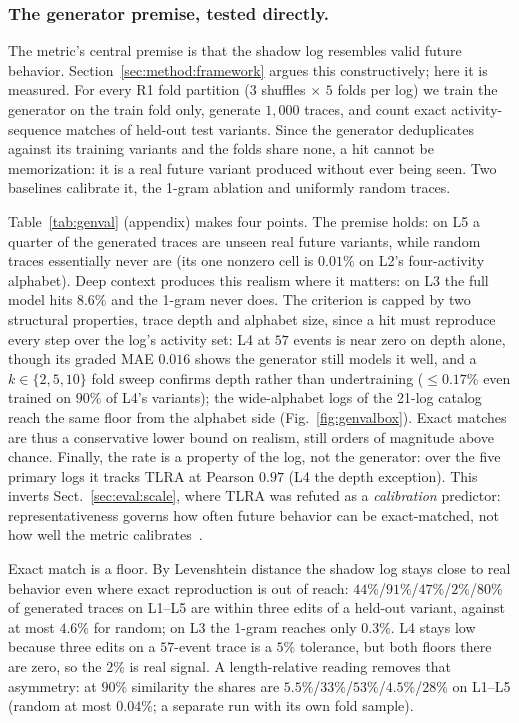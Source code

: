\documentclass[runningheads]{llncs}
\begin{document}
\subsubsection{The generator premise, tested directly.}
\label{sec:eval:genval}
The metric's central premise is that the shadow log resembles valid future behavior. Section~\ref{sec:method:framework} argues this constructively; here it is measured. For every R1 fold partition ($3$ shuffles $\times$ $5$ folds per log) we train the generator on the train fold only, generate $1{,}000$ traces, and count exact activity-sequence matches of held-out test variants. Since the generator deduplicates against its training variants and the folds share none, a hit cannot be memorization: it is a real future variant produced without ever being seen. Two baselines calibrate it, the 1-gram ablation and uniformly random traces.

Table~\ref{tab:genval} (appendix) makes four points. The premise holds: on L5 a quarter of the generated traces are unseen real future variants, while random traces essentially never are (its one nonzero cell is $0.01\%$ on L2's four-activity alphabet). Deep context produces this realism where it matters: on L3 the full model hits $8.6\%$ and the 1-gram never does. The criterion is capped by two structural properties, trace depth and alphabet size, since a hit must reproduce every step over the log's activity set: L4 at $57$ events is near zero on depth alone, though its graded MAE $0.016$ shows the generator still models it well, and a $k\in\{2,5,10\}$ fold sweep confirms depth rather than undertraining ($\le0.17\%$ even trained on $90\%$ of L4's variants); the wide-alphabet logs of the 21-log catalog reach the same floor from the alphabet side (Fig.~\ref{fig:genvalbox}). Exact matches are thus a conservative lower bound on realism, still orders of magnitude above chance. Finally, the rate is a property of the log, not the generator: over the five primary logs it tracks TLRA at Pearson $0.97$ (L4 the depth exception). This inverts Sect.~\ref{sec:eval:scale}, where TLRA was refuted as a \emph{calibration} predictor: representativeness governs how often future behavior can be exact-matched, not how well the metric calibrates~\cite{karunaratne2024representativeness}.

Exact match is a floor. By Levenshtein distance the shadow log stays close to real behavior even where exact reproduction is out of reach: $44\%$/$91\%$/$47\%$/$2\%$/$80\%$ of generated traces on L1--L5 are within three edits of a held-out variant, against at most $4.6\%$ for random; on L3 the 1-gram reaches only $0.3\%$. L4 stays low because three edits on a $57$-event trace is a $5\%$ tolerance, but both floors there are zero, so the $2\%$ is real signal. A length-relative reading removes that asymmetry: at $90\%$ similarity the shares are $5.5\%$/$33\%$/$53\%$/$4.5\%$/$28\%$ on L1--L5 (random at most $0.04\%$; a separate run with its own fold sample).
\end{document}
